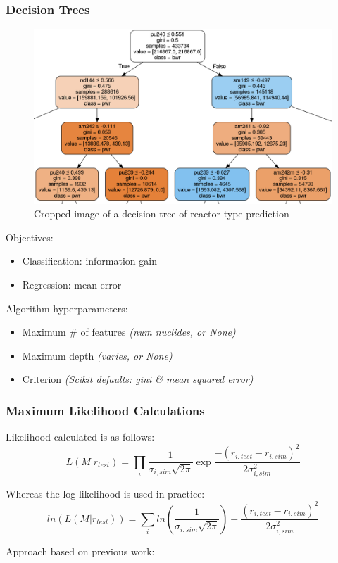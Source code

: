 \begin{frame}
  \frametitle{Decision Trees}
  \begin{adjustwidth}{-15pt}{0pt}
  \begin{minipage}{0.63\textwidth}
    \begin{figure}
      \centering
      \includegraphics[width=\textwidth]{./figures/dtree_crop.png}
      \caption{Cropped image of a decision tree of reactor type prediction}
    \end{figure}
  \end{minipage}%
  \hfill
  \begin{minipage}{0.4\textwidth}
    Objectives: %
    \begin{itemize}
      \item Classification: information gain
      \item Regression: mean error
    \end{itemize}
    Algorithm hyperparameters:
    \begin{itemize}
      \item Maximum \# of features \textit{(num nuclides, or None)}
      \item Maximum depth \textit{(varies, or None)}
      \item Criterion \textit{(Scikit defaults: gini \& mean squared error)}
    \end{itemize}
  \end{minipage}
  \end{adjustwidth}
\end{frame}

\begin{frame}
  \frametitle{Maximum Likelihood Calculations}

Likelihood calculated is as follows:
\[L(M|r_{test}) = \prod_i \frac{1}{\sigma_{i,sim} \sqrt{2\pi}} \exp{\frac{-(r_{i,test} - r_{i,sim})^2}{2 \sigma_{i,sim}^2}}\]

Whereas the log-likelihood is used in practice:
\[ln(L(M|r_{test})) = \sum_i ln(\frac{1}{\sigma_{i,sim} \sqrt{2\pi}}) - \frac{(r_{i,test} - r_{i,sim})^2}{2 \sigma_{i,sim}^2}\]

Approach based on previous work: \cite{mll_method, mll_sensitivity} \\~\\

\end{frame}
